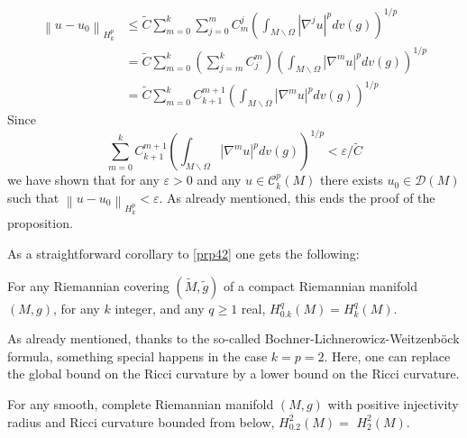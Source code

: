 \documentclass[12pt,hyperref,a4paper,UTF8]{ctexart}
\begin{document}
\begin{Proof}
$$\begin{aligned}
\left\|u-u_0\right\|_{H_k^p} & \leq \tilde{C} \sum_{m=0}^k \sum_{j=0}^m C_m^j\left(\int_{M \backslash \Omega}\left|\nabla^j u\right|^p d v(g)\right)^{1 / p} \\
& =\tilde{C} \sum_{m=0}^k\left(\sum_{j=m}^k C_j^m\right)\left(\int_{M \backslash \Omega}\left|\nabla^m u\right|^p d v(g)\right)^{1 / p} \\
& =\tilde{C} \sum_{m=0}^k C_{k+1}^{m+1}\left(\int_{M \backslash \Omega}\left|\nabla^m u\right|^p d v(g)\right)^{1 / p}
\end{aligned}
$$
Since
$$
\sum_{m=0}^k C_{k+1}^{m+1}\left(\int_{M \backslash \Omega}\left|\nabla^m u\right|^p d v(g)\right)^{1 / p}<\varepsilon / \tilde{C}
$$
we have shown that for any $\varepsilon>0$ and any $u \in \mathcal{C}_k^p(M)$ there exists $u_0 \in \mathcal{D}(M)$ such that $\left\|u-u_0\right\|_{H_k^p}<\varepsilon$. As already mentioned, this ends the proof of the proposition.
\end{Proof}

\vskip 3pt
As a straightforward corollary to \autoref{prp42} one gets the following:

\begin{Corollary}
    For any Riemannian covering $(\tilde{M}, \tilde{g})$ of a compact Riemannian manifold $(M, g)$, for any $k$ integer, and any $q \geq 1$ real, $H_{0 . k}^q(M)=H_k^q(M)$.
\label{cor41}
\end{Corollary}


\vskip 3pt
\noindent
As already mentioned, thanks to the so-called Bochner-Lichnerowicz-Weitzenböck formula, something special happens in the case $k=p=2$. Here, one can replace the global bound on the Ricci curvature by a lower bound on the Ricci curvature.

\begin{Proposition}
    For any smooth, complete Riemannian manifold $(M, g)$ with positive injectivity radius and Ricci curvature bounded from below, $H_{0.2}^2(M)=$ $H_2^2(M)$.
\label{prp43}
\end{Proposition}
\end{document}
